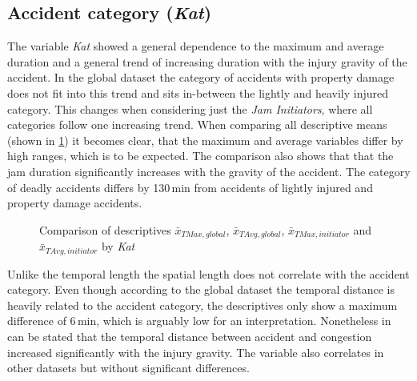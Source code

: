 \subsection{Accident category (\textit{Kat})}
\label{analysis_sum_Kat}
The variable \textit{Kat} showed a general dependence to the maximum and average duration and a general trend of increasing duration with the injury gravity of the accident. In the global dataset the category of accidents with property damage does not fit into this trend and sits in-between the lightly and heavily injured category. This changes when considering just the \textit{Jam Initiators}, where all categories follow one increasing trend. When comparing all descriptive means (shown in \cref{fig:baysis_summary_Kat_duration_barplot}) it becomes clear, that the maximum and average variables differ by high ranges, which is to be expected. The comparison also shows that that the jam duration significantly increases with the gravity of the accident. The category of deadly accidents differs by 130\,min from accidents of lightly injured and property damage accidents. 
\begin{figure}[ht!]
    \data
    \pgfplotstablesort[sort key=means, sort cmp=float >]{\datasorted}{\data}
    \tiny
    \centering
    \caption{Comparison of descriptives $\bar{x}_{TMax,global}$, $\bar{x}_{TAvg,global}$, $\bar{x}_{TMax,initiator}$ and $\bar{x}_{TAvg,initiator}$ by \textit{Kat}}
    \label{fig:baysis_summary_Kat_duration_barplot}
\end{figure}
Unlike the temporal length the spatial length does not correlate with the accident category. Even though according to the global dataset the temporal distance is heavily related to the accident category, the descriptives only show a maximum difference of 6\,min, which is arguably low for an interpretation. Nonetheless in can be stated that the temporal distance between accident and congestion increased significantly with the injury gravity. The variable also correlates in other datasets but without significant differences.


